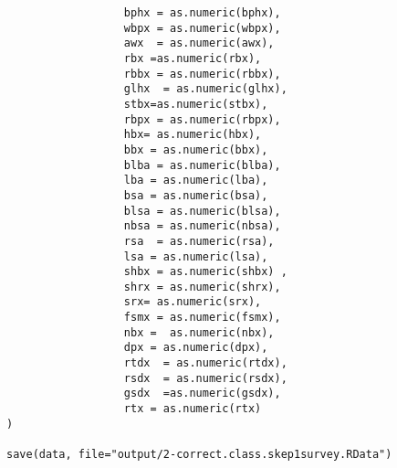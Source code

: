 \documentclass[idxtotoc,hyperref,openany]{labbook} %
\begin{document}
\begin{lstlisting}
                  bphx = as.numeric(bphx),   
                  wbpx = as.numeric(wbpx),    
                  awx  = as.numeric(awx), 
                  rbx =as.numeric(rbx),   
                  rbbx = as.numeric(rbbx),  
                  glhx  = as.numeric(glhx), 
                  stbx=as.numeric(stbx),    
                  rbpx = as.numeric(rbpx), 
                  hbx= as.numeric(hbx),
                  bbx = as.numeric(bbx),    
                  blba = as.numeric(blba),    
                  lba = as.numeric(lba),    
                  bsa = as.numeric(bsa),    
                  blsa = as.numeric(blsa),  
                  nbsa = as.numeric(nbsa),  
                  rsa  = as.numeric(rsa),   
                  lsa = as.numeric(lsa),    
                  shbx = as.numeric(shbx) ,  
                  shrx = as.numeric(shrx),    
                  srx= as.numeric(srx),    
                  fsmx = as.numeric(fsmx),   
                  nbx =  as.numeric(nbx),   
                  dpx = as.numeric(dpx),    
                  rtdx  = as.numeric(rtdx),  
                  rsdx  = as.numeric(rsdx),
                  gsdx  =as.numeric(gsdx),   
                  rtx = as.numeric(rtx)
) 

save(data, file="output/2-correct.class.skep1survey.RData")

\end{lstlisting}

\end{document}
